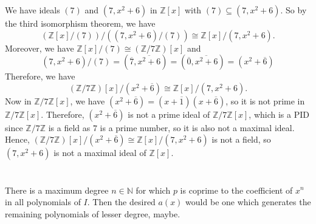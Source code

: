 \documentclass[12pt]{article}
\theoremstyle{definition}
\newcommand{\N}{\mathbb{N}}
\newcommand{\Z}{\mathbb{Z}}
\newcommand{\isom}{\cong}
\newcommand{\eqc}{\overline}
\begin{document}
We have ideals $(7)$ and $(7, x^2 + 6)$ in $\Z[x]$ with $(7) \subseteq (7, x^2 + 6)$. So by the third isomorphism theorem, we have
\[
    (\Z[x]/(7))/((7,x^2+6)/(7)) \isom \Z[x]/(7, x^2 + 6).
\]
Moreover, we have $\Z[x]/(7) \isom (\Z/7\Z)[x]$ and
\[
    (7,x^2+6)/(7) = (\eqc{7}, \eqc{x^2 + 6}) = (\eqc{0}, \eqc{x^2 + 6}) = (x^2 + \eqc{6})
\]
Therefore, we have
\[
    (\Z/7\Z)[x]/(x^2 + \eqc{6}) \isom \Z[x]/(7, x^2 + 6).
\]
Now in $\Z/7\Z[x]$, we have $(x^2 + \eqc{6}) = (x + \eqc{1})(x + \eqc{6})$, so it is not prime in $\Z/7\Z[x]$. Therefore, $(x^2 + \eqc{6})$ is not a prime ideal of $\Z/7\Z[x]$, which is a PID since $\Z/7\Z$ is a field as $7$ is a prime number, so it is also not a maximal ideal. Hence, $(\Z/7\Z)[x]/(x^2 + \eqc{6}) \isom \Z[x]/(7, x^2 + 6)$ is not a field, so $(7, x^2 + 6)$ is not a maximal ideal of $\Z[x]$.



\newpage

\section{}

There is a maximum degree $n \in \N$ for which $p$ is coprime to the coefficient of $x^n$ in all polynomials of $I$. Then the desired $a(x)$ would be one which generates the remaining polynomials of lesser degree, maybe.
\end{document}

